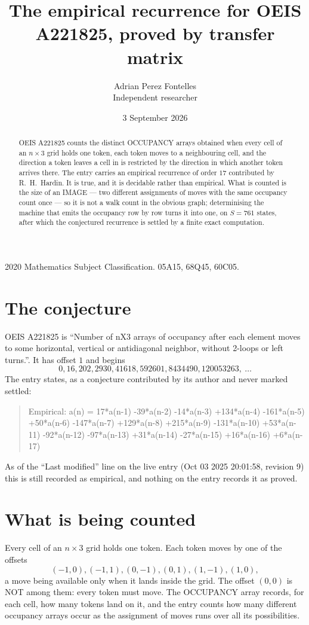\documentclass[11pt,a4paper]{article}
\title{The empirical recurrence for OEIS A221825, proved by transfer matrix}
\author{Adrian Perez Fontelles\\ \small Independent researcher}
\date{3 September 2026}
\theoremstyle{plain}
\theoremstyle{definition}
\begin{document}
\maketitle

\begin{abstract}
OEIS A221825 counts the distinct OCCUPANCY arrays obtained when every cell of an $n\times3$ grid
holds one token, each token moves to a neighbouring cell, and the direction a token leaves a
cell in is restricted by the direction in which another token arrives there. The entry carries
an empirical recurrence of order $17$ contributed by R.~H.~Hardin. It is true, and it is
decidable rather than empirical. What is counted is the size of an IMAGE --- two different
assignments of moves with the same occupancy count once --- so it is not a walk count in the
obvious graph; determinising the machine that emits the occupancy row by row turns it into
one, on $S=761$ states, after which the conjectured recurrence is settled by a finite exact
computation.
\end{abstract}

\noindent\small 2020 Mathematics Subject Classification. 05A15, 68Q45, 60C05.\normalsize

\section{The conjecture}

OEIS A221825 is ``Number of nX3 arrays of occupancy after each element moves to some horizontal, vertical or antidiagonal neighbor, without 2-loops or left turns.''. It has offset $1$ and begins
\[
0, 16, 202, 2930, 41618, 592601, 8434490, 120053263,\ \dots
\]
The entry states, as a conjecture contributed by its author and never marked settled:
\begin{quote}
Empirical: a(n) = 17*a(n-1) -39*a(n-2) -14*a(n-3) +134*a(n-4) -161*a(n-5) +50*a(n-6) -147*a(n-7) +129*a(n-8) +215*a(n-9) -131*a(n-10) +53*a(n-11) -92*a(n-12) -97*a(n-13) +31*a(n-14) -27*a(n-15) +16*a(n-16) +6*a(n-17)
\end{quote}
As of the ``Last modified'' line on the live entry (Oct 03 2025 20:01:58, revision 9) this is still
recorded as empirical, and nothing on the entry records it as proved.

\section{What is being counted}

Every cell of an $n\times3$ grid holds one token. Each token moves by one of the offsets
\[
(-1,0), (-1,1), (0,-1), (0,1), (1,-1), (1,0),
\]
a move being available only when it lands inside the grid. The offset $(0,0)$ is NOT among them: every token must move. The OCCUPANCY array
records, for each cell, how many tokens land on it, and the entry counts how many different
occupancy arrays occur as the assignment of moves runs over all its possibilities.
\end{document}
